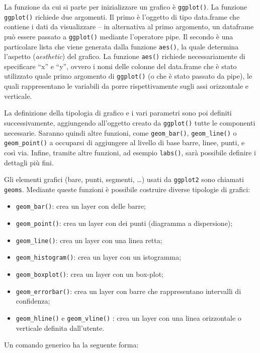 \documentclass[
  11pt,
]{krantz}
\theoremstyle{definition}
\theoremstyle{definition}
\theoremstyle{definition}
\theoremstyle{definition}
\theoremstyle{remark}
\begin{document}
La funzione da cui si parte per inizializzare un grafico è \texttt{ggplot()}. La funzione \texttt{ggplot()} richiede due argomenti. Il primo è l'oggetto di tipo data.frame che contiene i dati da visualizzare -- in alternativa al primo argomento, un dataframe può essere passato a \texttt{ggplot()} mediante l'operatore pipe. Il secondo è una particolare lista che viene generata dalla funzione \texttt{aes()}, la quale determina l'aspetto (\emph{aesthetic}) del grafico. La funzione \texttt{aes()} richiede necessariamente di specificare ``x'' e ``y'', ovvero i nomi delle colonne del data.frame che è stato utilizzato quale primo argomento di \texttt{ggplot()} (o che è stato passato da pipe), le quali rappresentano le variabili da porre rispettivamente sugli assi orizzontale e verticale.

La definizione della tipologia di grafico e i vari parametri sono poi definiti successivamente, aggiungendo all'oggetto creato da \texttt{ggplot()} tutte le componenti necessarie. Saranno quindi altre funzioni, come \texttt{geom\_bar()}, \texttt{geom\_line()} o \texttt{geom\_point()} a occuparsi di aggiungere al livello di base barre, linee, punti, e così via. Infine, tramite altre funzioni, ad esempio \texttt{labs()}, sarà possibile definire i dettagli più fini.

Gli elementi grafici (bare, punti, segmenti, \ldots) usati da \texttt{ggplot2} sono chiamati \texttt{geoms}. Mediante queste funzioni è possibile costruire diverse tipologie di grafici:

\begin{itemize}
\item
  \texttt{geom\_bar()}: crea un layer con delle barre;
\item
  \texttt{geom\_point()}: crea un layer con dei punti (diagramma a dispersione);
\item
  \texttt{geom\_line()}: crea un layer con una linea retta;
\item
  \texttt{geom\_histogram()}: crea un layer con un istogramma;
\item
  \texttt{geom\_boxplot()}: crea un layer con un box-plot;
\item
  \texttt{geom\_errorbar()}: crea un layer con barre che rappresentano intervalli di confidenza;
\item
  \texttt{geom\_hline()} e \texttt{geom\_vline()} : crea un layer con una linea orizzontale o verticale definita dall'utente.
\end{itemize}

Un comando generico ha la seguente forma:
\end{document}
